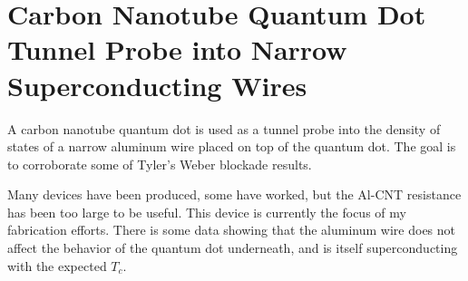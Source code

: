 \chapter{Carbon Nanotube Quantum Dot Tunnel Probe into Narrow Superconducting Wires}
\label{sec:CTNTAL}

A carbon nanotube quantum dot is used as a tunnel probe into the density of states of a narrow aluminum wire placed on top of the quantum dot. The goal is to corroborate some of Tyler's Weber blockade results.

Many devices have been produced, some have worked, but the Al-CNT resistance has been too large to be useful. This device is currently the focus of my fabrication efforts. There is some data showing that the aluminum wire does not affect the behavior of the quantum dot underneath, and is itself superconducting with the expected $T_c$. 